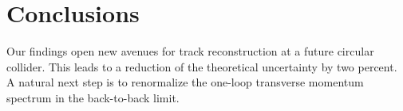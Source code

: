 \section{Conclusions}\label{sec:conclusions}

Our findings open new avenues for track reconstruction at a future
circular collider. This leads to a reduction of the theoretical
uncertainty by two percent. A natural next step is to renormalize the
one-loop transverse momentum spectrum in the back-to-back limit.

